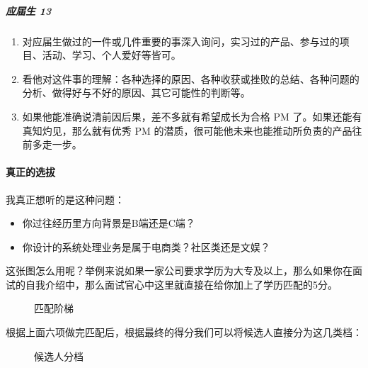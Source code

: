 \documentclass[letterpaper,11pt,english]{sphinxmanual}
\begin{document}
\subparagraph{应届生 13\sphinxfootnotemark[794]}
\label{\detokenize{chapter_interview/question:id7}}%
\begin{footnotetext}[794]\sphinxAtStartFootnote
{}
%
\end{footnotetext}\ignorespaces \begin{enumerate}
%
\item {} 
对应届生做过的一件或几件重要的事深入询问，实习过的产品、参与过的项目、活动、学习、个人爱好等皆可。

\item {} 
看他对这件事的理解：各种选择的原因、各种收获或挫败的总结、各种问题的分析、做得好与不好的原因、其它可能性的判断等。

\item {} 
如果他能准确说清前因后果，差不多就有希望成长为合格 PM
了。如果还能有真知灼见，那么就有优秀 PM
的潜质，很可能他未来也能推动所负责的产品往前多走一步。

\end{enumerate}


\paragraph{真正的选拔}
\label{\detokenize{chapter_interview/question:id8}}
我真正想听的是这种问题：
\begin{itemize}
\item {} 
你过往经历里方向背景是B端还是C端？

\item {} 
你设计的系统处理业务是属于电商类？社区类还是文娱？

\end{itemize}

这张图怎么用呢？举例来说如果一家公司要求学历为大专及以上，那么如果你在面试的自我介绍中，那么面试官心中这里就直接在给你加上了学历匹配的5分。

\begin{figure}[H]
\centering
\capstart

\noindent{}
\caption{匹配阶梯}\label{\detokenize{chapter_interview/question:id19}}\end{figure}

根据上面六项做完匹配后，根据最终的得分我们可以将候选人直接分为这几类档：

\begin{figure}[H]
\centering
\capstart

\noindent{}
\caption{候选人分档}\label{\detokenize{chapter_interview/question:id20}}\end{figure}
\end{document}
